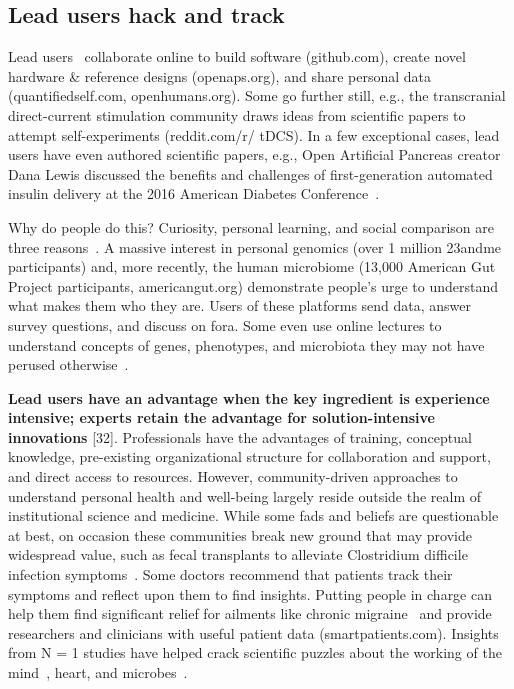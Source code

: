 \subsection{Lead users hack and track}
Lead users~\cite{VonHippel2005} collaborate online to build software
(github.com), create novel hardware \& reference designs
(openaps.org), and share personal data (quantifiedself.com,
openhumans.org). Some go further still, e.g., the transcranial
direct-current stimulation community draws ideas from scientific
papers to attempt self-experiments (reddit.com/r/
tDCS). In a few exceptional cases, lead users have even authored
scientific papers, e.g., Open Artificial Pancreas creator
Dana Lewis discussed the benefits and challenges of first-generation
automated insulin delivery at the 2016 American
Diabetes Conference~\cite{DanaLewis}.

Why do people do this? Curiosity, personal learning, and social
comparison are three reasons~\cite{Reinecke2015}. A massive interest in
personal genomics (over 1 million 23andme participants)
and, more recently, the human microbiome (13,000 American
Gut Project participants, americangut.org) demonstrate
people’s urge to understand what makes them who they are.
Users of these platforms send data, answer survey questions,
and discuss on fora. Some even use online lectures to understand
concepts of genes, phenotypes, and microbiota they
may not have perused otherwise~\cite{23andMe2017, Knight2016}. 

\textbf{Lead users have an advantage when the key ingredient is experience intensive; experts retain the
advantage for solution-intensive innovations} [32]. Professionals have the advantages of training,
conceptual knowledge, pre-existing organizational structure for collaboration and support, and
direct access to resources. However, community-driven approaches to understand personal
health and well-being largely reside outside the realm
of institutional science and medicine. While some fads and
beliefs are questionable at best, on occasion these communities
break new ground that may provide widespread value,
such as fecal transplants to alleviate Clostridium difficile infection
symptoms~\cite{Brandt2012}. Some doctors recommend that patients
track their symptoms and reflect upon them to find
insights. Putting people in charge can help them find significant
relief for ailments like chronic migraine~\cite{Gawande2017} and provide
researchers and clinicians with useful patient data
(smartpatients.com). Insights from N = 1 studies have helped
crack scientific puzzles about the working of the mind~\cite{V.S.Ramachandran1998},
heart, and microbes~\cite{Weisse2012}. 

